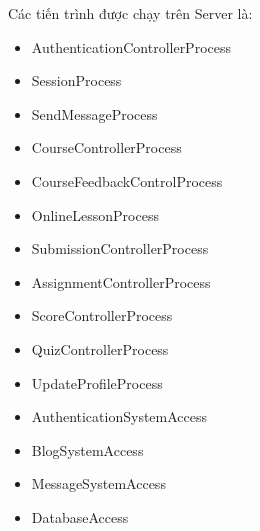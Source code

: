 \documentclass[./../main.tex]{subfiles}
\begin{document}
Các tiến trình được chạy trên Server là:
\begin{itemize}
	\item AuthenticationControllerProcess
	\item SessionProcess
	\item SendMessageProcess
	\item CourseControllerProcess
	\item CourseFeedbackControlProcess
	\item OnlineLessonProcess
	\item SubmissionControllerProcess
	\item AssignmentControllerProcess
	\item ScoreControllerProcess
	\item QuizControllerProcess
	\item UpdateProfileProcess
	\item AuthenticationSystemAccess
	\item BlogSystemAccess
	\item MessageSystemAccess
	\item DatabaseAccess
\end{itemize}
\end{document}
